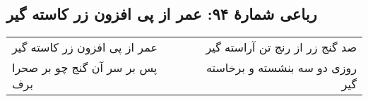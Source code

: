 \begin{center}
\section*{رباعی شمارهٔ ۹۴: عمر از پی افزون زر کاسته گیر}
\label{sec:094}
\begin{longtable}{l p{0.5cm} r}
عمر از پی افزون زر کاسته گیر
&&
صد گنج زر از رنج تن آراسته گیر
\\
پس بر سر آن گنج چو بر صحرا برف
&&
روزی دو سه بنشسته و برخاسته گیر
\\
\end{longtable}
\end{center}
